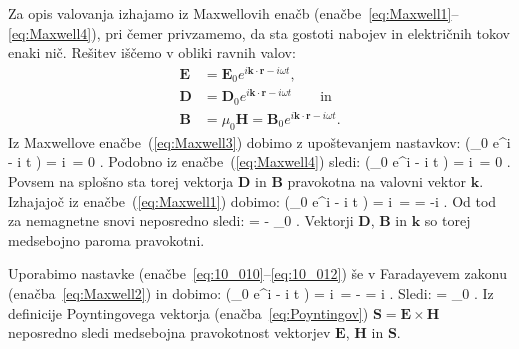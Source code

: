 Za opis valovanja izhajamo iz Maxwellovih enačb (enačbe~\ref{eq:Maxwell1}--\ref{eq:Maxwell4}), 
pri čemer privzamemo, da sta gostoti nabojev in električnih tokov enaki nič. 
Rešitev iščemo v obliki ravnih valov:
\begin{align}
 \mathbf{E} &= \mathbf{E}_0 e^{i\mathbf{k}\cdot \mathbf{r} - i \omega t}, \label{eq:10_010}\\
 \mathbf{D} &= \mathbf{D}_0 e^{i\mathbf{k}\cdot \mathbf{r} - i \omega t} \qquad \mathrm{in}\label{eq:10_011}\\
 \mathbf{B} &= \mu_0 \mathbf{H} = \mathbf{B}_0 e^{i\mathbf{k}\cdot \mathbf{r} - i \omega t}.
 \label{eq:10_012}
\end{align}
Iz Maxwellove enačbe~(\ref{eq:Maxwell3}) dobimo z upoštevanjem nastavkov:
\beq
\nabla \cdot \left(_0 e^{i\cdot {} - i \omega t} \right) = 
i\,\cdot {} = 0 \qquad \Longrightarrow \qquad {} \perp {}.
\label{eq:10_013}
\eeq
Podobno iz enačbe~(\ref{eq:Maxwell4}) sledi:
\beq
\nabla \cdot \left(_0 e^{i\cdot {} - i \omega t} \right) = 
i\,\cdot {} = 0 \qquad \Longrightarrow \qquad {} \perp {}.
\label{eq:10_014}
\eeq
Povsem na splošno sta torej vektorja $\mathbf{D}$ in $\mathbf{B}$ pravokotna na valovni vektor $\mathbf{k}$.
Izhajajoč iz enačbe~(\ref{eq:Maxwell1}) dobimo:
\beq
\nabla \times \left(_0 e^{i\cdot {} - i \omega t} \right) = 
i\,\times {} =  = -i \omega {}.
\label{eq:10_015}
\eeq
Od tod za nemagnetne snovi neposredno sledi:
\beq
{}\times {} = - \mu_0 \omega {} \qquad \Longrightarrow \qquad {} \perp {}.
\label{eq:10_016}
\eeq
Vektorji $\mathbf{D}$, $\mathbf{B}$ in $\mathbf{k}$ so torej medsebojno paroma pravokotni.

Uporabimo nastavke (enačbe~\ref{eq:10_010}--\ref{eq:10_012})
še v Faradayevem zakonu (enačba~\ref{eq:Maxwell2}) in dobimo:
\beq
\nabla \times \left(_0 e^{i\cdot {} - i \omega t} \right) = 
i\,\times {} = -  = i \omega {}.
\label{eq:10_017}
\eeq
Sledi:
\beq
{}\times {} = \omega \mu_0  \qquad \Longrightarrow 
\qquad {} \perp {}.
\label{eq:10_018}
\eeq
Iz definicije Poyntingovega vektorja (enačba~\ref{eq:Poyntingov}) 
$\mathbf{S} = \mathbf{E} \times \mathbf{H}$ neposredno sledi medsebojna 
pravokotnost vektorjev $\mathbf{E}$, $\mathbf{H}$ in $\mathbf{S}$.

